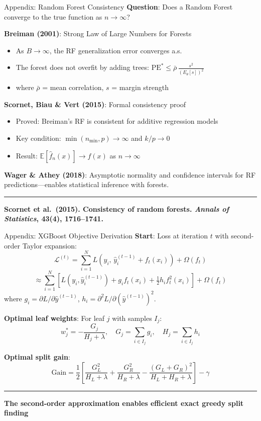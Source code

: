 \documentclass[8pt,aspectratio=169]{beamer}
\newcommand{\bottomnote}[1]{%
\vfill
\vspace{-2mm}
\textcolor{mllavender2}{\rule{\textwidth}{0.4pt}}
\vspace{1mm}
\footnotesize
\textbf{#1}
}
\begin{document}
\begin{frame}[t]{Appendix: Random Forest Consistency}
\textbf{Question}: Does a Random Forest converge to the true function as $n \to \infty$?

\vspace{0.3em}
\textbf{Breiman (2001)}: Strong Law of Large Numbers for Forests
\begin{itemize}
\item As $B \to \infty$, the RF generalization error converges a.s.
\item The forest does not overfit by adding trees: $\text{PE}^* \leq \bar{\rho}\, \frac{s^2}{(E_\theta[s])^2}$
\item where $\bar{\rho}$ = mean correlation, $s$ = margin strength
\end{itemize}

\vspace{0.3em}
\textbf{Scornet, Biau \& Vert (2015)}: Formal consistency proof
\begin{itemize}
\item Proved: Breiman's RF is consistent for additive regression models
\item Key condition: $\min(n_{\min}, p) \to \infty$ and $k/p \to 0$
\item Result: $\mathbb{E}[\hat{f}_n(x)] \to f(x)$ as $n \to \infty$
\end{itemize}

\vspace{0.3em}
\textbf{Wager \& Athey (2018)}: Asymptotic normality and confidence intervals for RF predictions---enables statistical inference with forests.
\bottomnote{Scornet et al.\ (2015). Consistency of random forests. \textit{Annals of Statistics}, 43(4), 1716--1741.}
\end{frame}

\begin{frame}[t]{Appendix: XGBoost Objective Derivation}
\textbf{Start}: Loss at iteration $t$ with second-order Taylor expansion:
\[
\mathcal{L}^{(t)} = \sum_{i=1}^{N} L\!\left(y_i,\, \hat{y}_i^{(t-1)} + f_t(x_i)\right) + \Omega(f_t)
\]
\[
\approx \sum_{i=1}^{N}\left[L(y_i, \hat{y}_i^{(t-1)}) + g_i f_t(x_i) + \tfrac{1}{2}h_i f_t^2(x_i)\right] + \Omega(f_t)
\]
where $g_i = \partial L/\partial \hat{y}^{(t-1)}$, $h_i = \partial^2 L / \partial (\hat{y}^{(t-1)})^2$.

\vspace{0.3em}
\textbf{Optimal leaf weights}: For leaf $j$ with samples $I_j$:
\[
w_j^* = -\frac{G_j}{H_j + \lambda}, \quad G_j = \sum_{i \in I_j} g_i, \quad H_j = \sum_{i \in I_j} h_i
\]

\textbf{Optimal split gain}:
\[
\text{Gain} = \frac{1}{2}\!\left[\frac{G_L^2}{H_L + \lambda} + \frac{G_R^2}{H_R + \lambda} - \frac{(G_L + G_R)^2}{H_L + H_R + \lambda}\right] - \gamma
\]
\bottomnote{The second-order approximation enables efficient exact greedy split finding}
\end{frame}
\end{document}
